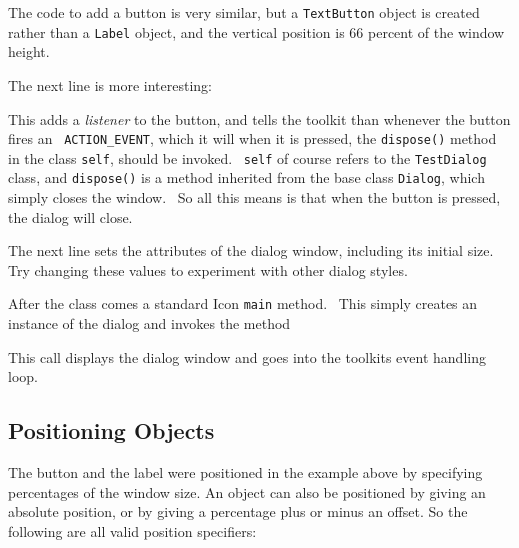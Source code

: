 The code to add a button is very similar, but a \texttt{TextButton}
object is created rather than a \texttt{Label} object, and the vertical
position is 66 percent of the window height. 

The next line is more interesting:


\noindent This adds a \textit{listener} to the button, and tells the toolkit
than whenever the button fires an \ \texttt{ACTION\_EVENT}, which it will
when it is pressed, the \texttt{dispose()} method in the class
\texttt{self}, should be invoked. \ \texttt{self} of course refers to
the \texttt{TestDialog} class, and \texttt{dispose()} is a method
inherited from the base class \texttt{Dialog}, which simply closes the
window. \ So all this means is that when the button is pressed, the
dialog will close.

The next line sets the attributes of the dialog window, including its
initial size. Try changing these values to experiment with other dialog
styles.


After the class comes a standard Icon \texttt{main} method. \ This
simply creates an instance of the dialog and invokes the method


\noindent This call displays the dialog window and goes into the
toolkit{\textquotesingle}s event handling loop. 

\subsection{Positioning Objects}

The button and the label were positioned in the example above by
specifying percentages of the window size. An object can also be
positioned by giving an absolute position, or by giving a percentage
plus or minus an offset. So the following are all valid position
specifiers:


